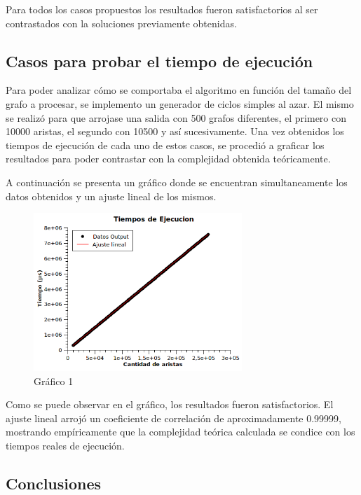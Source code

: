 \documentclass[a4paper, 12pt]{article}
\begin{document}
Para todos los casos propuestos los resultados fueron satisfactorios al ser contrastados con la soluciones previamente obtenidas.

\subsection*{Casos para probar el tiempo de ejecución}
Para poder analizar cómo se comportaba el algoritmo en función del tama\~{n}o del grafo a procesar, se implemento un generador de ciclos simples al azar. El mismo se realizó para que arrojase una salida con 500 grafos diferentes, el primero con 10000 aristas, el segundo con 10500 y así sucesivamente. Una vez obtenidos los tiempos de ejecución de cada uno de estos casos, se procedió a graficar los resultados para poder contrastar con la complejidad obtenida teóricamente.

A continuación se presenta un gráfico donde se encuentran simultaneamente los datos obtenidos y un ajuste lineal de los mismos.


\begin{figure}[H]
\centering
\includegraphics[width=0.7\textwidth]{imagenes/Resultados1.png} 
\caption{Gráfico 1}
\end{figure}

Como se puede observar en el gráfico, los resultados fueron satisfactorios. El ajuste lineal arrojó un coeficiente de correlación de aproximadamente 0.99999, mostrando empíricamente que la complejidad teórica calculada se condice con los tiempos reales de ejecución. 

\subsection*{Conclusiones}
\end{document}
